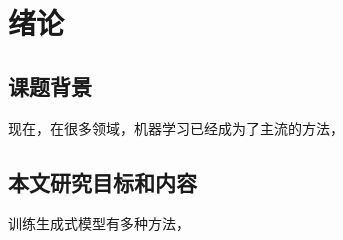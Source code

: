 \chapter{绪论}

\section{课题背景}

现在，在很多领域，机器学习已经成为了主流的方法\cite{nasrabadi2007pattern}，


\section{本文研究目标和内容}

训练生成式模型有多种方法，


%
%
%
